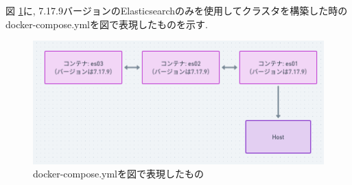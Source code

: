 図 \ref{4-p3}に, 7.17.9バージョンのElasticsearchのみを使用してクラスタを構築した時のdocker-compose.ymlを図で表現したものを示す.

\begin{figure}
  \begin{center}
    \includegraphics[width=120mm]{sotu/figure/all-7.19.9.png}
    \caption{docker-compose.ymlを図で表現したもの}
    \label{4-p3}
  \end{center}
\end{figure}




